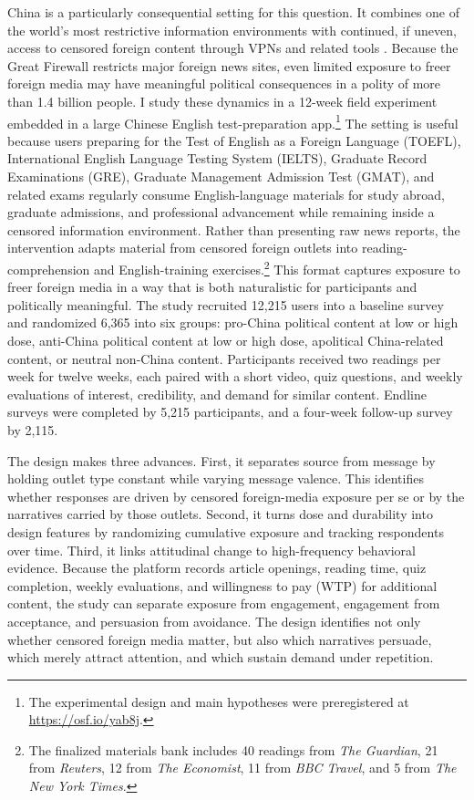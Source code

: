 \documentclass[12pt,american]{article}
\begin{document}
China is a particularly consequential setting for this question. It combines one of the world’s most restrictive information environments with continued, if uneven, access to censored foreign content through VPNs and related tools \citep{ChangEtAl2022,FreedomHouse2024,hobbsroberts2018}. Because the Great Firewall restricts major foreign news sites, even limited exposure to freer foreign media may have meaningful political consequences in a polity of more than 1.4 billion people. I study these dynamics in a 12-week field experiment embedded in a large Chinese English test-preparation app.\footnote{The experimental design and main hypotheses were preregistered at \url{https://osf.io/yab8j}.} The setting is useful because users preparing for the Test of English as a Foreign Language (TOEFL), International English Language Testing System (IELTS), Graduate Record Examinations (GRE), Graduate Management Admission Test (GMAT), and related exams regularly consume English-language materials for study abroad, graduate admissions, and professional advancement while remaining inside a censored information environment. Rather than presenting raw news reports, the intervention adapts material from censored foreign outlets into reading-comprehension and English-training exercises.\footnote{The finalized materials bank includes 40 readings from \textit{The Guardian}, 21 from \textit{Reuters}, 12 from \textit{The Economist}, 11 from \textit{BBC Travel}, and 5 from \textit{The New York Times}.} This format captures exposure to freer foreign media in a way that is both naturalistic for participants and politically meaningful. The study recruited 12,215 users into a baseline survey and randomized 6,365 into six groups: pro-China political content at low or high dose, anti-China political content at low or high dose, apolitical China-related content, or neutral non-China content. Participants received two readings per week for twelve weeks, each paired with a short video, quiz questions, and weekly evaluations of interest, credibility, and demand for similar content. Endline surveys were completed by 5,215 participants, and a four-week follow-up survey by 2,115.

The design makes three advances. First, it separates source from message by holding outlet type constant while varying message valence. This identifies whether responses are driven by censored foreign-media exposure per se or by the narratives carried by those outlets. Second, it turns dose and durability into design features by randomizing cumulative exposure and tracking respondents over time. Third, it links attitudinal change to high-frequency behavioral evidence. Because the platform records article openings, reading time, quiz completion, weekly evaluations, and willingness to pay (WTP) for additional content, the study can separate exposure from engagement, engagement from acceptance, and persuasion from avoidance. The design identifies not only whether censored foreign media matter, but also which narratives persuade, which merely attract attention, and which sustain demand under repetition.
	
\end{document}
